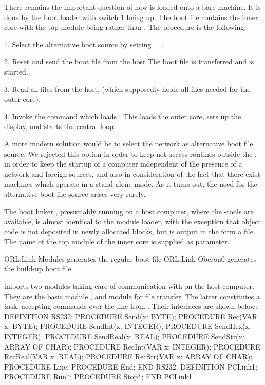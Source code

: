 There remains the important question of how  is loaded onto a bare machine. It is done by the boot loader with switch 1 being up. The boot file contains the inner core with the top module being  rather than . The procedure is the following:

\item{1.} Select the alternative boot source by setting  = .
\item{2.} Reset and send the boot file from the host The boot file is transferred and  is started.
\item{3.} Read all files from the host, (which supposedly holds all files needed for the outer core).
\item{4.} Invoke the command which loads . This loads the outer core, sets up the display, and starts the central loop.

A more modern solution would be to select the network as alternative boot file source. We rejected this option in order to keep net access routines outside the , in order to keep the startup of a computer independent of the presence of a network and foreign sources, and also in consideration of the fact that there exist machines which operate in a stand-alone mode. As it turns out, the need for the alternative boot file source arises very rarely.

The boot linker , presumably running on a host computer, where the -tools are available, is almost identical to the module loader, with the exception that object code is not deposited in newly allocated blocks, but is output in the form a file. The name of the top module of the inner core is supplied as parameter.

ORL.Link Modules generates the regular boot file
ORL.Link Oberon0 generates the build-up boot file

 imports two modules taking care of communication with  on the host computer. They are the basic module , and module  for file transfer. The latter constitutes a task, accepting commands over the line from . Their interfaces are shown below:
\begintt
DEFINITION RS232;
PROCEDURE Send(x: BYTE);
PROCEDURE Rec(VAR x: BYTE);
PROCEDURE SendInt(x: INTEGER); PROCEDURE SendHex(x: INTEGER); PROCEDURE SendReal(x: REAL); PROCEDURE SendStr(x: ARRAY OF CHAR); PROCEDURE RecInt(VAR x: INTEGER); PROCEDURE RecReal(VAR x: REAL); PROCEDURE RecStr(VAR x: ARRAY OF CHAR); PROCEDURE Line;
PROCEDURE End;
END RS232.
DEFINITION PCLink1; PROCEDURE Run*; PROCEDURE Stop*;
END PCLink1.
\endtt

